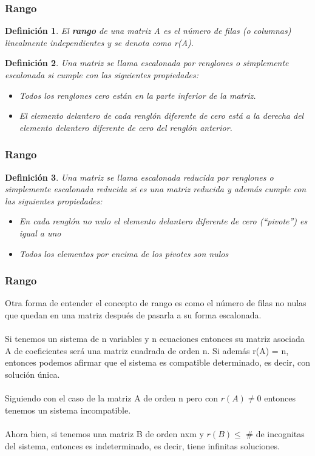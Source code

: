 \documentclass[11pt]{beamer}
\newtheorem{defi}{Definición}
\begin{document}
\begin{frame}
\frametitle{Rango}
\begin{defi}
El \textbf{rango} de una matriz A es el número de filas (o columnas) linealmente independientes y se denota como r(A).
\end{defi}
\begin{defi}
Una matriz se llama escalonada por renglones o simplemente escalonada si cumple con las siguientes propiedades:\\
\begin{itemize}
\item Todos los renglones cero están en la parte inferior de la matriz.
\item El elemento delantero de cada renglón diferente de cero está a la derecha del elemento
delantero diferente de cero del renglón anterior.
\end{itemize}
\end{defi}
\end{frame}

\begin{frame}
\frametitle{Rango}
\begin{defi}
Una matriz se llama escalonada reducida por renglones o simplemente escalonada reducida si es una matriz reducida y además cumple con las siguientes propiedades:
\begin{itemize}
\item En cada renglón no nulo el elemento delantero diferente de cero (“pivote”) es igual a uno
\item Todos los elementos por encima de los pivotes son nulos
\end{itemize}
\end{defi}
\end{frame}

\begin{frame}
\frametitle{Rango}
Otra forma de entender el concepto de rango es como el número de filas no nulas que quedan en una matriz después de pasarla a su forma escalonada.\\ \hspace{0cm} \\
Si tenemos un sistema de n variables y n ecuaciones entonces su matriz asociada A de coeficientes será una matriz cuadrada de orden n. Si además r(A) = n, entonces podemos afirmar que el sistema es compatible determinado, es decir, con solución única.\\ \hspace{0cm} \\
Siguiendo con el caso de la matriz A de orden n pero con $r(A)\neq 0$ entonces tenemos un sistema incompatible.\\ \hspace{0cm} \\
Ahora bien, si tenemos una matriz B de orden nxm y $r(B)\leq$  \# de incognitas del sistema, entonces es indeterminado, es decir, tiene infinitas soluciones.
\end{frame}
\end{document}
